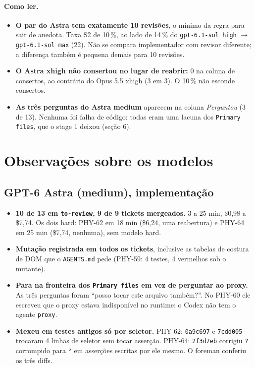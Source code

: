 \documentclass[11pt,a4paper]{article}
\begin{document}
\paragraph{Como ler.}
\begin{itemize}
  \item \textbf{O par do Astra tem exatamente 10 revisões}, o mínimo da regra
        para sair de anedota. Taxa S2 de 10\,\%, ao lado de 14\,\% do
        \texttt{gpt-6.1-sol high} $\to$ \texttt{gpt-6.1-sol max} (22). Não se
        compara implementador com revisor diferente; a diferença também é
        pequena demais para 10 revisões.
  \item \textbf{O Astra xhigh não consertou no lugar de reabrir:} 0 na coluna de
        consertos, ao contrário do Opus 5.5 xhigh (3 em 3). O 10\,\% não esconde
        consertos.
  \item \textbf{As três perguntas do Astra medium} aparecem na coluna
        \emph{Perguntou} (3 de 13). Nenhuma foi falha de código: todas eram uma
        lacuna dos \texttt{Primary files}, que o stage 1 deixou (seção 6).
\end{itemize}

\section{Observações sobre os modelos}

\subsection*{GPT-6 Astra (medium), implementação}
\begin{itemize}
  \item \textbf{10 de 13 em \texttt{to-review}, 9 de 9 tickets mergeados.} 3 a
        25 min, \$0,98 a \$7,74. Os dois hard: PHY-62 em 18 min (\$6,24, uma
        reabertura) e PHY-64 em 25 min (\$7,74, nenhuma), sem modelo hard.
  \item \textbf{Mutação registrada em todos os tickets}, inclusive as tabelas de
        costura de DOM que o \texttt{AGENTS.md} pede (PHY-59: 4 testes, 4
        vermelhos sob o mutante).
  \item \textbf{Para na fronteira dos \texttt{Primary files} em vez de
        perguntar ao proxy.} As três perguntas foram ``posso tocar este arquivo
        também?''. No PHY-60 ele escreveu que o proxy estava indisponível no
        runtime: o Codex não tem o agente \texttt{proxy}.
  \item \textbf{Mexeu em testes antigos só por seletor.} PHY-62:
        \texttt{0a9c697} e \texttt{7cdd005} trocaram 4 linhas de seletor sem
        tocar asserção. PHY-64: \texttt{2f3d7eb} corrigiu \texttt{?} corrompido
        para \texttt{²} em asserções escritas por ele mesmo. O foreman conferiu os
        três diffs.
\end{itemize}
\end{document}
